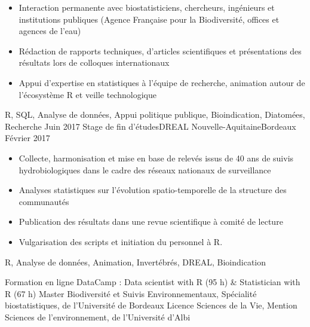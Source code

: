 \documentclass[localFont,alternative]{yaac-another-awesome-cv}
\begin{document}
\begin{experiences}
{\begin{itemize}
                        \item Interaction permanente avec biostatisticiens, chercheurs, ingénieurs et institutions publiques (Agence Française pour la Biodiversité, offices et agences de l'eau)
                        \item Rédaction de rapports techniques, d'articles scientifiques et présentations des résultats lors de colloques internationaux
                        \item Appui d'expertise en statistiques à l'équipe de recherche, animation autour de l'écosystème R et veille technologique                                                                         
                      \end{itemize}
                    }
                    {R, SQL, Analyse de données, Appui politique publique, Bioindication, Diatomées, Recherche}
  \emptySeparator
  \experience
    {Juin 2017} {Stage de fin d'études}{DREAL Nouvelle-Aquitaine}{Bordeaux}
    {Février 2017}    {
                      \begin{itemize}              
                        \item Collecte, harmonisation et mise en base de relevés issus de 40 ans de suivis hydrobiologiques dans le cadre des réseaux nationaux de surveillance               
                        \item Analyses statistiques sur l’évolution spatio-temporelle de la structure des communautés 
                        \item Publication des résultats dans une revue scientifique à comité de lecture    
                        \item Vulgarisation des scripts et initiation du personnel à R.  
                                                
                      \end{itemize}
                    }
                    {R, Analyse de données, Animation, Invertébrés, DREAL, Bioindication}
 
  
\end{experiences}


\begin{scholarship}

					{Formation en ligne DataCamp : Data scientist with R (95 h) \& Statistician with R (67 h)}
					{Master Biodiversité et Suivis Environnementaux, Spécialité biostatistiques, de l'Université de Bordeaux}
					{Licence Sciences de la Vie, Mention Sciences de l'environnement, de l'Université d'Albi}
\end{scholarship}
\end{document}
